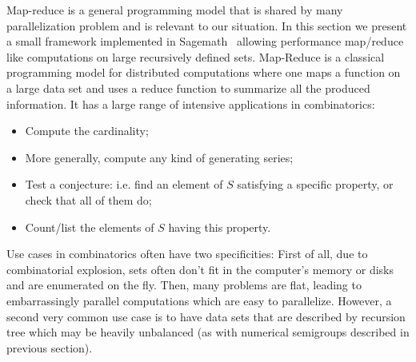 \documentclass{deliverablereport}
\begin{document}
Map-reduce is a general programming model that is shared by many
parallelization problem and is relevant to our situation. In this section we
present a small framework implemented in Sagemath~\cite{sage} allowing
performance map/reduce like computations on
large recursively defined sets. Map-Reduce is a classical programming model
for distributed computations where one maps a function on a large data set and
uses a reduce function to summarize all the produced information. It has a
large range of intensive applications in combinatorics:
\begin{itemize}
  \item Compute the cardinality;
  \item More generally, compute any kind of generating series;
  \item Test a conjecture: i.e. find an element of $S$ satisfying a specific
    property, or check that all of them do;
  \item Count/list the elements of $S$ having this property.
\end{itemize}
Use cases in combinatorics often have two specificities: First of all, due to
combinatorial explosion, sets often don't fit in the computer's memory or
disks and are enumerated on the fly. Then, many problems are flat, leading to
embarrassingly parallel computations which are easy to parallelize. However, a
second very common use case is to have data sets that are described by
recursion tree which may be heavily unbalanced (as with numerical semigroups
described in previous section).
\end{document}
